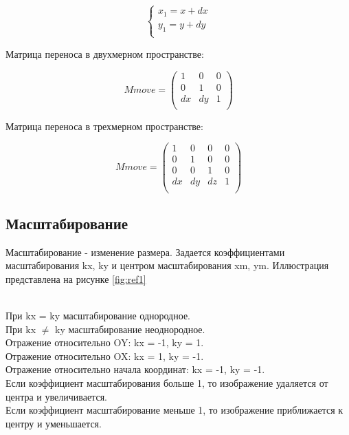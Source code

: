 \begin{equation}
	{\begin{cases}
			x_1 = x + dx \\
			y_1 = y + dy \\
		\end{cases}}
\end{equation}

Матрица переноса в двухмерном пространстве:

\begin{equation}
	Mmove = \left(
	\begin{array}{cccc}
			1  & 0  & 0 \\
			0  & 1  & 0 \\
			dx & dy & 1 \\
		\end{array}
	\right)
\end{equation}

Матрица переноса в трехмерном пространстве:

\begin{equation}
	Mmove = \left(
	\begin{array}{cccc}
			1  & 0  & 0  & 0 \\
			0  & 1  & 0  & 0 \\
			0  & 0  & 1  & 0 \\
			dx & dy & dz & 1 \\
		\end{array}
	\right)
\end{equation}

\subsection {Масштабирование}

Масштабирование - изменение размера. Задается коэффициентами масштабирования kx, ky и центром масштабирования xm, ym. Иллюстрация представлена на рисунке \ref{fig:ref1} \\
\begin{figure}[ht!]
\end{figure}
\\
При kx = ky масштабирование однородное.\\
При kx $\neq$ ky масштабирование неоднородное.\\
Отражение относительно OY: kx = -1, ky = 1.\\
Отражение относительно OX: kx = 1, ky = -1.\\
Отражение относительно начала координат: kx = -1, ky = -1.\\
Если коэффициент масштабирования больше 1, то изображение удаляется от центра и увеличивается.\\
Если коэффициент масштабирование меньше 1, то изображение приближается к центру и уменьшается.\\

